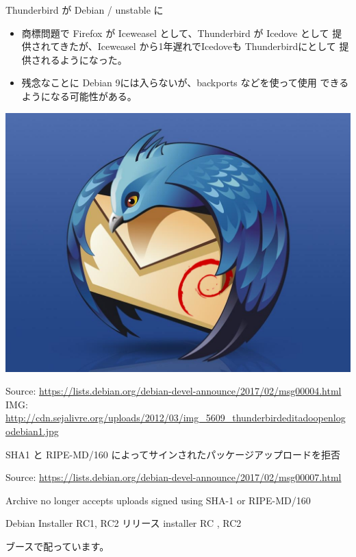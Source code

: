 \begin{frame}{Thunderbird が Debian / unstable に}

\begin{itemize}
\item 商標問題で Firefox が Iceweasel として、Thunderbird が Icedove として
提供されてきたが、Iceweasel から1年遅れでIcedoveも Thunderbirdにとして
提供されるようになった。
\item 残念なことに Debian 9には入らないが、backports などを使って使用
できるようになる可能性がある。
\end{itemize}

\begin{center}
\includegraphics[width=0.6\hsize]{image201703/img_5609_thunderbirdeditadoopenlogodebian1.jpg}
\end{center}

Source: \url{https://lists.debian.org/debian-devel-announce/2017/02/msg00004.html}
IMG: \url{http://cdn.sejalivre.org/uploads/2012/03/img_5609_thunderbirdeditadoopenlogodebian1.jpg}

\end{frame}

\begin{frame}{SHA1 と RIPE-MD/160 によってサインされたパッケージアップロードを拒否}

Source: \url{https://lists.debian.org/debian-devel-announce/2017/02/msg00007.html}

Archive no longer accepts uploads signed using SHA-1 or RIPE-MD/160

\end{frame}

\begin{frame}{Debian Installer RC1, RC2 リリース}
installer RC , RC2

ブースで配っています。
\end{frame}


